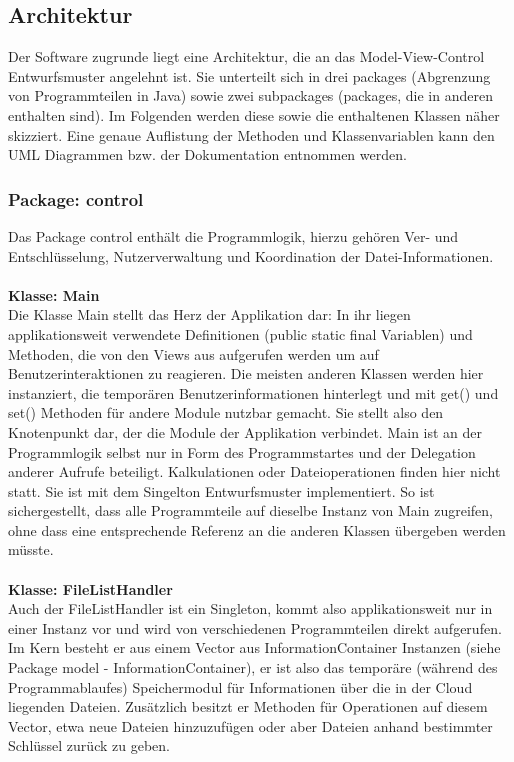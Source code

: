 \documentclass[13pt,a4paper,bibliography=totocnumbered,listof=totocnumbered]{scrartcl}
\begin{document}
\subsection{Architektur}
Der Software zugrunde liegt eine Architektur, die an das Model-View-Control Entwurfsmuster angelehnt ist. Sie unterteilt sich in drei packages (Abgrenzung von Programmteilen in Java) sowie zwei subpackages (packages, die in anderen enthalten sind). Im Folgenden werden diese sowie die enthaltenen Klassen näher skizziert. Eine genaue Auflistung der Methoden und Klassenvariablen kann den UML Diagrammen bzw. der Dokumentation entnommen werden.

\subsubsection{Package: control}
Das Package control enthält die Programmlogik, hierzu gehören Ver- und Entschlüsselung, Nutzerverwaltung und Koordination der Datei-Informationen.\\\\
\textbf{Klasse: Main}\\
Die Klasse Main stellt das Herz der Applikation dar: In ihr liegen applikationsweit verwendete Definitionen (public static final Variablen) und Methoden, die von den Views aus aufgerufen werden um auf Benutzerinteraktionen zu reagieren. Die meisten anderen Klassen werden hier instanziert, die temporären Benutzerinformationen hinterlegt und mit get() und set() Methoden für andere Module nutzbar gemacht. Sie stellt also den Knotenpunkt dar, der die Module der Applikation verbindet. Main ist an der Programmlogik selbst nur in Form des Programmstartes und der Delegation anderer Aufrufe beteiligt. Kalkulationen oder Dateioperationen finden hier nicht statt. Sie ist mit dem Singelton Entwurfsmuster implementiert. So ist sichergestellt, dass alle Programmteile auf dieselbe Instanz von Main zugreifen, ohne dass eine entsprechende Referenz an die anderen Klassen übergeben werden müsste.\\\\
\textbf{Klasse: FileListHandler}\\
Auch der FileListHandler ist ein Singleton, kommt also applikationsweit nur in einer Instanz vor und wird von verschiedenen Programmteilen direkt aufgerufen. Im Kern besteht er aus einem Vector aus InformationContainer Instanzen (siehe Package model - InformationContainer), er ist also das temporäre (während des Programmablaufes) Speichermodul für Informationen über die in der Cloud liegenden Dateien. Zusätzlich besitzt er Methoden für Operationen auf diesem Vector, etwa neue Dateien hinzuzufügen oder aber Dateien anhand bestimmter Schlüssel zurück zu geben.\\\\
\end{document}
